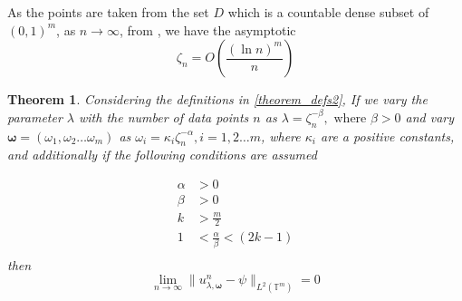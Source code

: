 \documentclass[multixcb]{amstext-l}
\theoremstyle{plain}
\newtheorem{theorem}{Theorem}[chapter]
\theoremstyle{definition}
\theoremstyle{definition}
\theoremstyle{remark}
\numberwithin{equation}{chapter}
\begin{document}
As the points are taken from the set $D$ which is a countable dense subset of $(0,1)^m$, as $n\to\infty$, from \cite{kuipers2012uniform}, we have the asymptotic $$\zeta_n = O(\frac{(\ln {n})^m}{n}) $$


\begin{theorem}
Considering the definitions in \ref{theorem_defs2}, If we vary the parameter $\lambda$ with the number of data points $n$ as $\lambda = \zeta^{-\beta}_n,\mbox{   where }\beta>0$ and vary $\boldsymbol{\omega} = (\omega_1,\omega_2\ldots\omega_m)$ as $\omega_i = \kappa_i\zeta_n^{-\alpha},i = 1,2\ldots m$, where $\kappa_i$ are a positive constants, and additionally if the following conditions are assumed 

\begin{equation}
     \begin{aligned}
     \alpha &> 0\\
     \beta &> 0\\
     k&>\frac{m}{2}\\%
      1&<\frac{\alpha}{\beta} <(2k-1)\\
     \end{aligned}
 \end{equation}
 then
\begin{equation}
    \label{th_bv}
    \lim\limits_{n\to\infty}\|u_{\lambda,\boldsymbol{\omega}}^n - \psi\|_{L^2(\mathbb{T}^m)} = 0
\end{equation}
\end{theorem}
\end{document}
